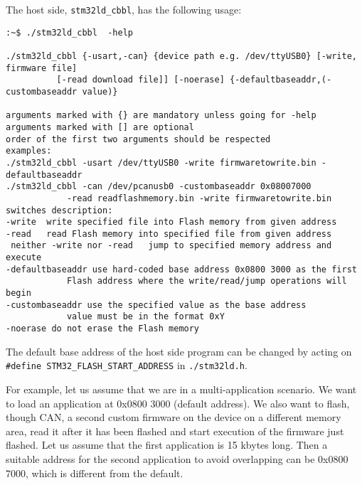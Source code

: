 \documentclass[11pt]{article} %
\begin{document}
The host side, \texttt{stm32ld\_cbbl}, has the following usage:
\begin{verbatim}
:~$ ./stm32ld_cbbl	-help

./stm32ld_cbbl {-usart,-can} {device path e.g. /dev/ttyUSB0} [-write, firmware file]
          [-read download file]] [-noerase] {-defaultbaseaddr,(-custombaseaddr value)}

arguments marked with {} are mandatory unless going for -help
arguments marked with [] are optional
order of the first two arguments should be respected
examples:
./stm32ld_cbbl -usart /dev/ttyUSB0 -write firmwaretowrite.bin -defaultbaseaddr
./stm32ld_cbbl -can /dev/pcanusb0 -custombaseaddr 0x08007000
            -read readflashmemory.bin -write firmwaretowrite.bin
switches description:
-write	write specified file into Flash memory from given address
-read	read Flash memory into specified file from given address
 neither -write nor -read	jump to specified memory address and execute
-defaultbaseaddr use hard-coded base address 0x0800 3000 as the first
            Flash address where the write/read/jump operations will begin
-custombaseaddr use the specified value as the base address
            value must be in the format 0xY
-noerase do not erase the Flash memory
\end{verbatim}
The default base address of the host side program can be changed by acting on \texttt {\#define STM32\_FLASH\_START\_ADDRESS} in \texttt{./stm32ld.h}.

For example, let us assume that we are in a multi-application scenario. We want to load an application at 0x0800 3000 (default address). We also want to flash, though CAN, a second custom firmware on the device on a different memory area, read it after it has been flashed and start execution of the firmware just flashed. Let us assume that the first application is 15 kbytes long. Then a suitable address for the second application to avoid overlapping can be 0x0800 7000, which is different from the default.
\end{document}

